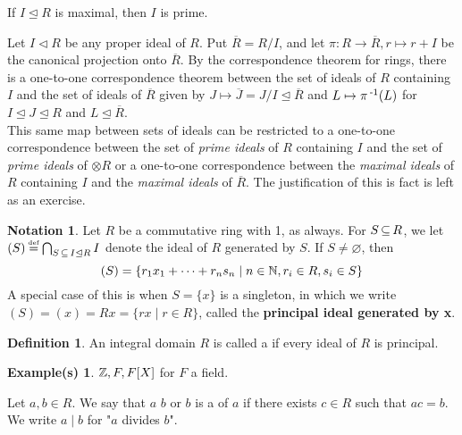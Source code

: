 \documentclass[11pt]{book}
\newcounter{counter}
\theoremstyle{definition}   \newtheorem{defn}[counter]{Definition} %
\newtheorem*{notation*}{Notation}   \newtheorem{example}[counter]{Example(s)}   \newtheorem*{example*}{Example(s)}   \newtheorem*{warning}{Warning} \newtheorem*{corollary*}{Corollary}
\newcommand{\ov}{\overline}   \newcommand{\wt}{\widetilde}
\newcommand{\nsg}{\mathrel{\unlhd}}   \newcommand{\ind}{\parindent24pt}   \newcommand{\vn}{\varnothing}
\newcommand\myeq{\mathrel{\overset{\makebox[0pt]{\mbox{\normalfont\tiny\sffamily \textrm{def}}}}{=}}}
\newcommand{\tl}{\triangleleft}   \newcommand{\sd}[1]{\rtimes_{#1}}   \newcommand{\x}{^{\times}}   \newcommand{\cyc}[1]{\begin{pmatrix} #1 \end{pmatrix}}
\DeclareMathOperator{\ra}{\rightarrow}   \DeclareMathOperator{\Poly}{\mathbf{P}}   \DeclareMathOperator{\spn}{\textnormal{span}}   \DeclareMathOperator{\aut}{\textnormal{Aut}}
\newcommand{\vs}{\vspace{8pt}}
\numberwithin{counter}{chapter}
\begin{document}
\vs

\begin{corollary}
If $I \nsg R$ is maximal, then $I$ is prime.
\end{corollary}

\vs

\begin{remark}
Let $I \tl R$ be any proper ideal of $R$. Put $\ov{R} = R/I$, and let $\pi : R \ra \ov{R}, r \mapsto r+I$ be the canonical projection onto $\ov{R}$. By the correspondence theorem for rings, there is a one-to-one correspondence theorem between the set of ideals of $R$ containing $I$ and the set of ideals of $\ov{R}$ given by $J \mapsto \ov{J} = J/I \nsg \ov{R}$ and $L \mapsto \pi\operatorname{^{-1}}(L)$ for $I \nsg J \nsg R$ and $L \nsg \ov{R}$. \\

This same map between sets of ideals can be restricted to a one-to-one correspondence between the set of \emph{prime ideals} of $R$ containing $I$ and the set of \emph{prime ideals} of $\otimes{R}$ or a one-to-one correspondence between the \emph{maximal ideals} of $R$ containing $I$ and the \emph{maximal ideals} of $\ov{R}$. The justification of this is fact is left as an exercise.
\end{remark}

\vs

\begin{notation*}
Let $R$ be a commutative ring with 1, as always. For $S \operatorname{\subseteq} R$, we let $(S) \myeq \bigcap_{S \sub I \nsg R} I$ denote the ideal of $R$ generated by $S$. If $S \ne \vn$, then
	\[(S) = \{r_1x_1 + \dots + r_n s_n \mid n \in \operatorname{\mathbb{N}}, r_i \in R, s_i \in S\} \]
A special case of this is when $S = \{x\}$ is a singleton, in which we write $(S) = (x) = Rx = \{rx \mid r \in R\}$, called the \textbf{principal ideal generated by x}.
\end{notation*}

\vs

\begin{defn}
An integral domain $R$ is called a  if every ideal of $R$ is principal.
\begin{example*}
$\operatorname{\mathbb{Z}},F,F[X]$ for $F$ a field.
\end{example*}
Let $a,b \in R$. We say that $a$  $b$ or $b$ is a  of $a$ if there exists $c \in R$ such that $ac = b$. We write $a \mid b$ for "$a$ divides $b$".
\end{defn}

\vs
\end{document}

